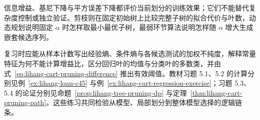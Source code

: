 信息增益、基尼下降与平方误差下降都评价当前划分的训练效果；它们不能替代复杂度控制或独立验证。剪枝则在固定初始树上比较完整子树的拟合代价与叶数，动态规划说明固定 $\alpha$ 时怎样取最小最优子树，最弱环节算法说明怎样随 $\alpha$ 增大生成嵌套候选序列。

复习时应能从样本计数写出经验熵、条件熵与各候选测试的加权不纯度，解释常量特征为何不能计算增益比，区分回归叶的均值与分类叶的多数类，并由式~\eqref{eq:lihang-cart-pruning-difference} 推出有效阈值。教材习题 5.1、5.2 的计算分别见例~\ref{ex:lihang-loan-c45} 与例~\ref{ex:lihang-cart-regression-exercise}；习题 5.3、5.4 的论证分别见命题~\ref{prop:lihang-tree-pruning-dp} 与定理~\ref{thm:lihang-cart-pruning-path}。这些练习共同检验从模型、局部划分到整体模型选择的逻辑链条。






